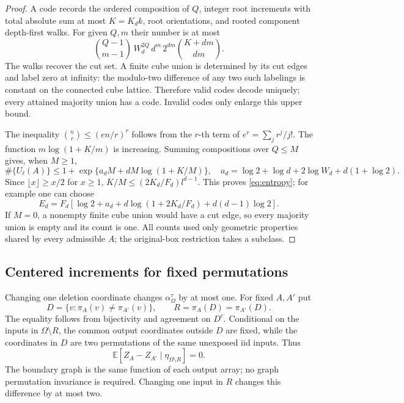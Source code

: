 \documentclass[11pt,a4paper]{article}
\newcommand{\E}{\mathbb E}
\numberwithin{equation}{section}
\begin{document}
\begin{proof}
A code records the ordered composition of $Q$, integer root increments
with total absolute sum at most $K=K_dk$, root orientations, and rooted
component depth-first walks. For given $Q,m$ their number is at most
\[
 \binom{Q-1}{m-1}\,W_d^{2Q}\,d^m\,
 2^{dm}\binom{K+dm}{dm}.
\]
The walks recover the cut set. A finite cube union is determined by its
cut edges and label zero at infinity: the modulo-two difference of any
two such labelings is constant on the connected cube lattice.
Therefore valid codes decode uniquely; every attained majority union
has a code. Invalid codes only enlarge this upper bound.

The inequality $\binom{n}{r}\le(en/r)^r$ follows from the $r$-th
term of $e^r=\sum_j r^j/j!$.
The function $m\log(1+K/m)$ is increasing.
Summing compositions over $Q\le M$ gives, when $M\ge1$,
\[
 \#\{U_\ell(A)\}\le
 1+\exp\{a_d M+dM\log(1+K/M)\},
 \quad a_d=\log2+\log d+2\log W_d+d(1+\log2).
\]
Since $\lfloor x\rfloor\ge x/2$ for $x\ge1$,
$K/M\le (2K_d/F_d)l^{d-1}$.
This proves \eqref{eq:entropy}; for example one can choose
\[
 E_d=F_d\left[\log2+a_d+d\log(1+2K_d/F_d)
                     +d(d-1)\log2\right].
\]
If $M=0$, a nonempty finite cube union would have a cut edge, so every
majority union is empty and its count is one.
All counts used only geometric properties shared by every admissible $A$;
the original-box restriction takes a subclass.
\end{proof}

\subsection{Centered increments for fixed permutations}
Changing one deletion coordinate changes $\alpha_\Omega^\tau$ by at
most one. For fixed $A,A'$ put
\[
 D=\{v:\pi_A(v)\ne\pi_{A'}(v)\},\qquad
 R=\pi_A(D)=\pi_{A'}(D).
\]
The equality follows from bijectivity and agreement on $D^c$.
Conditional on the inputs in $\Omega\setminus R$, the common output
coordinates outside $D$ are fixed, while the coordinates in $D$ are
two permutations of the same unexposed iid inputs. Thus
\begin{equation}\label{eq:conditional-center}
 \E[Z_A-Z_{A'}\mid\eta_{\Omega\setminus R}]=0.
\end{equation}
The boundary graph is the same function of each output array; no graph
permutation invariance is required.
Changing one input in $R$ changes this difference by at most two.
\end{document}

